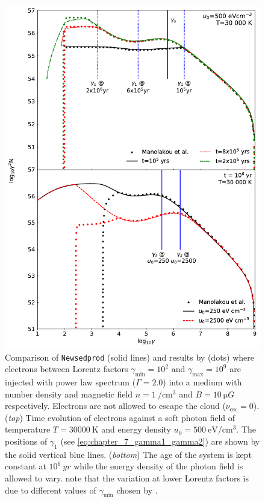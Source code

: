 \begin{figure}[hbtp]
    \centering
    \includegraphics[width=\textwidth]{07_Particle_Evolution/Images/Code/manolakou_verification.pdf}
    \caption{Comparison of {\tt Newsedprod} (solid lines) and results by \cite{2007A&A...474..689M} (dots) where electrons between Lorentz factors $\gamma_\text{min}=10^2$ and $\gamma_\text{max}=10^9$ are injected with power law spectrum ($\Gamma =2.0$) into a medium with number density and magnetic field $n=1~\si{\per\centi\meter\cubed}$ and $B=10~\si{\micro G}$ respectively. Electrons are not allowed to escape the cloud ($\nu_\text{esc}=0$). (\textit{top}) Time evolution of electrons against a soft photon field of temperature $T=30000~\si{\kelvin}$ and energy density $u_0=500~\si{\electronvolt\per\centi\meter\cubed}$.  The positions of $\gamma_1$ (see \autoref{eq:chapter_7_gamma1_gamma2}) are shown by the solid vertical blue lines. (\textit{bottom}) The age of the system is kept constant at $10^6~\si{yr}$ while the energy density of the photon field is allowed to vary. note that the variation at lower Lorentz factors is due to different values of $\gamma_\text{min}$ chosen by \cite{2007A&A...474..689M}.}
    \label{fig:chapter_7_manolakou_verification}
\end{figure}

